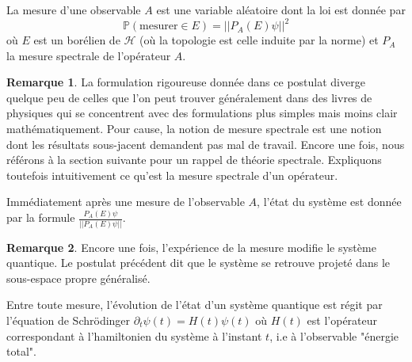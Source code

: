 \documentclass[12pt,openany,a4paper, titlepage]{article}
\newcommand{\f}[2]{\frac{#1}{#2}}
\newcommand{\HH}{\mathcal{H}}
\theoremstyle{definition}
\theoremstyle{definition}
\theoremstyle{definition}
\theoremstyle{definition}
\theoremstyle{definition}
\newtheorem{rem}{Remarque}
\theoremstyle{definition}
\begin{document}
\vspace{3mm}
\begin{tcolorbox}[colback=gray!5!white,
                  colframe=gray!80!white,
                  title= Postulat 4 : Principe de décomposition spectrale ]
La mesure d'une observable $A$ est une variable aléatoire dont la loi est donnée par $$\mathbb{P}(\text{mesurer} \in E) = ||P_A(E)\psi||^2$$
où $E$ est un borélien de $\HH$ (où la topologie est celle induite par la norme) et $P_A$ la mesure spectrale de l'opérateur $A$.  
\end{tcolorbox}
\vspace{3mm}

\begin{rem}
    La formulation rigoureuse donnée dans ce postulat diverge quelque peu de celles que l'on peut trouver généralement dans des livres de physiques qui se concentrent avec des formulations plus simples mais moins clair mathématiquement. Pour cause, la notion de mesure spectrale est une notion dont les résultats sous-jacent demandent pas mal de travail. Encore une fois, nous référons à la section suivante pour un rappel de théorie spectrale. Expliquons toutefois intuitivement ce qu'est la mesure spectrale d'un opérateur.
\end{rem}

\vspace{3mm}
\begin{tcolorbox}[colback=gray!5!white,
                  colframe=gray!80!white,
                  title= Postulat 5 : Principe de réduction du paquet d’onde ]
Immédiatement après une mesure de l'observable $A$, l'état du système est donnée par la formule $\f{P_A(E)\psi}{||P_A(E)\psi||}$.
\end{tcolorbox}
\vspace{3mm}

\begin{rem}
    Encore une fois, l'expérience de la mesure modifie le système quantique. Le postulat précédent dit que le système se retrouve projeté dans le sous-espace propre généralisé. 
\end{rem}

\vspace{3mm}
\begin{tcolorbox}[colback=gray!5!white,
                  colframe=gray!80!white,
                  title= Postulat 6 : Evolution d'un système dans le temps ]
Entre toute mesure, l'évolution de l'état d'un système quantique est régit par l'équation de Schrödinger 
$\partial_t \psi(t) = H(t)\psi(t)$
où $H(t)$ est l'opérateur correspondant à l'hamiltonien du système à l'instant $t$, i.e à l'observable "énergie total".
\end{tcolorbox}
\vspace{3mm}
\end{document}
